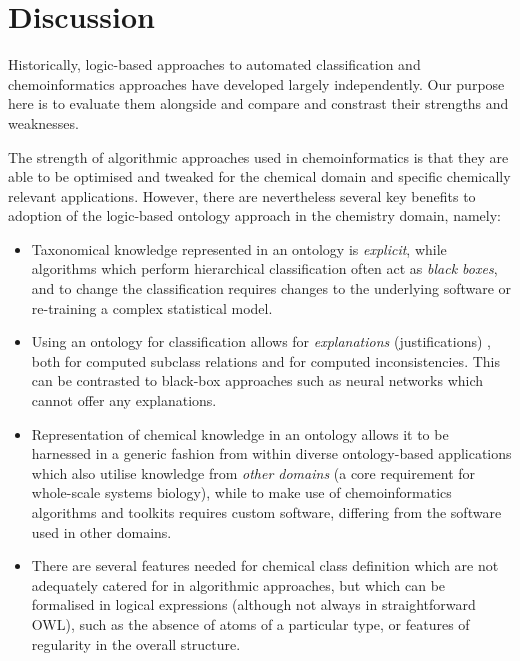 \documentclass[10pt]{bmc_article}
\newenvironment{bmcformat}{\baselineskip20pt\sloppy\setboolean{publ}{false}}{\baselineskip20pt\sloppy}
\begin{document}
\begin{bmcformat}
\section*{Discussion}



Historically, logic-based approaches to automated classification and chemoinformatics approaches have developed largely independently. Our purpose here is to evaluate them alongside and compare and constrast their strengths and weaknesses. 

The strength of algorithmic approaches used in chemoinformatics is that they are able to be optimised and tweaked for the chemical domain and specific chemically relevant applications. However, there are nevertheless several key benefits to adoption of the logic-based ontology approach in the chemistry domain, namely:
\begin{itemize}
	\item Taxonomical knowledge represented in an ontology is \textit{explicit}, while algorithms which perform hierarchical classification often act as \textit{black boxes}, and to change the classification requires changes to the underlying software or re-training a complex statistical model.
	\item Using an ontology for classification allows for \textit{explanations} (justifications) \cite{horridgeentail09}, both for computed subclass relations and for computed inconsistencies. This can be contrasted to black-box approaches such as neural networks which cannot offer any explanations. 
	\item Representation of chemical knowledge in an ontology allows it to be harnessed in a generic fashion from within diverse ontology-based applications which also utilise knowledge from \textit{other domains} (a core requirement for whole-scale systems biology), while to make use of chemoinformatics algorithms and toolkits requires custom software, differing from the software used in other domains.
	\item There are several features needed for chemical class definition which are not adequately catered for in algorithmic approaches, but which can be formalised in logical expressions (although not always in straightforward OWL), such as the absence of atoms of a particular type, or features of regularity in the overall structure. 
\end{itemize}


\end{bmcformat}
\end{document}
